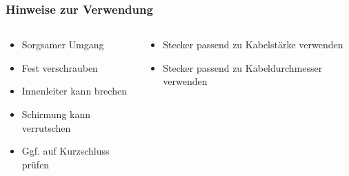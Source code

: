 \begin{frame}
\frametitle{Hinweise zur Verwendung}
\begin{columns}
    \begin{column}{0.48\textwidth}
    \begin{itemize}
  \item Sorgsamer Umgang
  \item Fest verschrauben
  \item Innenleiter kann brechen
  \item Schirmung kann verrutschen
  \item Ggf. auf Kurzschluss prüfen
  \end{itemize}

    \end{column}
   \begin{column}{0.48\textwidth}
       \begin{itemize}
  \item Stecker passend zu Kabelstärke verwenden
  \item Stecker passend zu Kabeldurchmesser verwenden
  \end{itemize}

   \end{column}
\end{columns}

\end{frame}%
